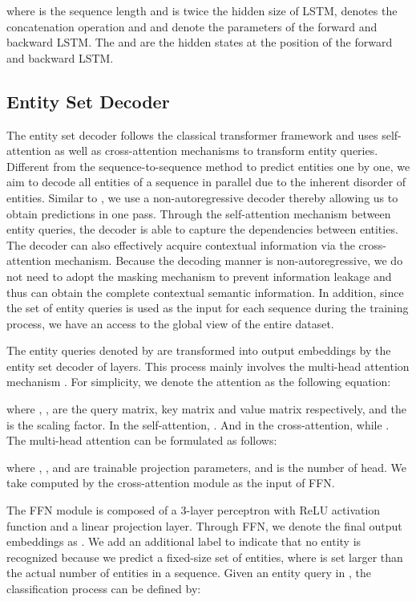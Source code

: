 \documentclass{article}
\begin{document}
where  is the sequence length and  is twice the hidden size of LSTM,  denotes the concatenation operation and  and  denote the parameters of the forward and backward LSTM. The  and  are the hidden states at the position  of the forward and backward LSTM.


\subsection{Entity Set Decoder}
The entity set decoder follows the classical transformer framework and uses self-attention as well as cross-attention mechanisms to transform  entity queries. Different from the sequence-to-sequence method \cite{strakova2019neural} to predict entities one by one, we aim to decode all entities of a sequence in parallel due to the inherent disorder of entities. Similar to \cite{gu2018non}, we use a non-autoregressive decoder thereby allowing us to obtain  predictions in one pass. Through the self-attention mechanism between entity queries, the decoder is able to capture the dependencies between entities. The decoder can also effectively acquire contextual information via the cross-attention mechanism. Because the decoding manner is non-autoregressive, we do not need to adopt the masking mechanism to prevent information leakage and thus can obtain the complete contextual semantic information. In addition, since the set of entity queries is used as the input for each sequence during the training process, we have an access to the global view of the entire dataset.

The  entity queries denoted by  are transformed into output embeddings by the entity set decoder of  layers. This process mainly involves the multi-head attention mechanism \cite{vaswani2017attention}. For simplicity, we denote the attention as the following equation:


where , ,  are the query matrix, key matrix and value matrix respectively, and the  is the scaling factor. In the self-attention, . And in the cross-attention,  while . The multi-head attention can be formulated as follows:




where , ,  and  are trainable projection parameters, and  is the number of head. We take  computed by the cross-attention module as the input of FFN.

The FFN module is composed of a 3-layer perceptron with ReLU activation function and a linear projection layer. Through FFN, we denote the final output embeddings as . We add an additional label  to indicate that no entity is recognized because we predict a fixed-size set of  entities, where  is set larger than the actual number of entities in a sequence. Given an entity query  in , the classification process can be defined by:
\end{document}
